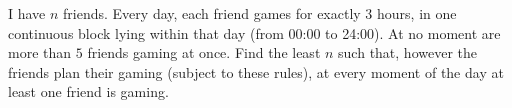 I have $n$ friends. Every day, each friend games for exactly $3$ hours, in one continuous block lying within that day (from 00:00 to 24:00). At no moment are more than $5$ friends gaming at once. Find the least $n$ such that, however the friends plan their gaming (subject to these rules), at every moment of the day at least one friend is gaming.
